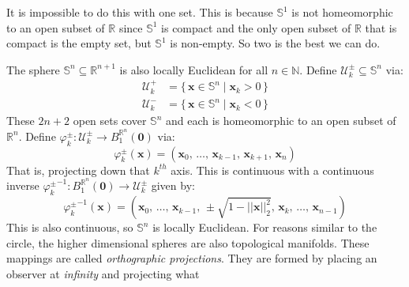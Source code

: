 \documentclass{article}
\theoremstyle{plain}
\theoremstyle{normal}
\newenvironment{example}{%
    \pushQED{\qed}\renewcommand{\qedsymbol}{$\blacksquare$}\examplex%
}{%
    \popQED\endexamplex%
}
\begin{document}
        It is impossible to do this with one set. This is because
        $\mathbb{S}^{1}$ is not homeomorphic to an open subset of
        $\mathbb{R}$ since $\mathbb{S}^{1}$ is compact and the only open subset
        of $\mathbb{R}$ that is compact is the empty set, but
        $\mathbb{S}^{1}$ is non-empty. So two is the best we can do.
        \begin{example}
            The sphere $\mathbb{S}^{n}\subseteq\mathbb{R}^{n+1}$ is also
            locally Euclidean for all $n\in\mathbb{N}$. Define
            $\mathcal{U}_{k}^{\pm}\subseteq\mathbb{S}^{n}$ via:
            \begin{align}
                \mathcal{U}_{k}^{+}
                &=\{\,\mathbf{x}\in\mathbb{S}^{n}\;|\;
                    \mathbf{x}_{k}>0\,\}\\
                \mathcal{U}_{k}^{-}
                &=\{\,\mathbf{x}\in\mathbb{S}^{n}\;|\;
                    \mathbf{x}_{k}<0\,\}
            \end{align}
            These $2n+2$ open sets cover $\mathbb{S}^{n}$ and each is
            homeomorphic to an open subset of $\mathbb{R}^{n}$. Define
            $\varphi_{k}^{\pm}:\mathcal{U}_{k}^{\pm}\rightarrow{B}_{1}^{\mathbb{R}^{n}}(\mathbf{0})$
            via:
            \begin{equation}
                \varphi_{k}^{\pm}(\mathbf{x})=
                (\mathbf{x}_{0},\,\dots,\,\mathbf{x}_{k-1},\,
                    \mathbf{x}_{k+1},\,\mathbf{x}_{n})
            \end{equation}
            That is, projecting down that $k^{th}$ axis. This is continuous
            with a continuous inverse
            ${\varphi_{k}^{\pm}}^{-1}:B_{1}^{\mathbb{R}^{n}}(\mathbf{0})\rightarrow\mathcal{U}_{k}^{\pm}$
            given by:
            \begin{equation}
                {\varphi_{k}^{\pm}}^{-1}(\mathbf{x})
                =(\mathbf{x}_{0},\,\dots,\,\mathbf{x}_{k-1},\,
                    \pm\sqrt{1-||\mathbf{x}||_{2}^{2}},\,\mathbf{x}_{k},\,
                    \dots,\,\mathbf{x}_{n-1})
            \end{equation}
            This is also continuous, so $\mathbb{S}^{n}$ is locally Euclidean.
            For reasons similar to the circle, the higher dimensional spheres
            are also topological manifolds.
        \end{example}
        These mappings are called \textit{orthographic projections}. They are
        formed by placing an observer at \textit{infinity} and projecting what
\end{document}
